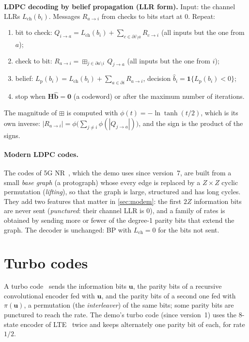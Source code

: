 \documentclass[11pt,a4paper]{article}
\newcommand{\Lch}{L_{\mathrm{ch}}}
\newcommand{\Lp}{L_{\mathrm{p}}}
\theoremstyle{definition}
\theoremstyle{remark}
\newenvironment{keybox}{\begin{center}\begin{lrbox}{\keyboxbin}\begin{minipage}{0.92\textwidth}}{\end{minipage}\end{lrbox}\setlength{\fboxsep}{8pt}\fcolorbox{icemagenta}{iceground}{\usebox{\keyboxbin}}\end{center}}
\begin{document}
\begin{keybox}
\textbf{LDPC decoding by belief propagation (LLR form).} Input: the channel LLRs $\Lch(b_i)$. Messages $R_{a\to i}$ from checks to bits start at 0. Repeat:
\begin{enumerate}[leftmargin=*]
  \item bit to check: $Q_{i\to a} = \Lch(b_i) + \sum_{c\in\partial i\setminus a} R_{c\to i}$ (all inputs but the one from $a$);
  \item check to bit: $R_{a\to i} = \boxplus_{j\in\partial a\setminus i}\, Q_{j\to a}$ (all inputs but the one from $i$);
  \item belief: $\Lp(b_i) = \Lch(b_i) + \sum_{a\in\partial i} R_{a\to i}$, decision $\hat b_i = \mathbf{1}\{\Lp(b_i)<0\}$;
  \item stop when $\bm{H}\hat{\bm{b}} = \bm{0}$ (a codeword) or after the maximum number of iterations.
\end{enumerate}
The magnitude of $\boxplus$ is computed with $\phi(t) = -\ln\tanh(t/2)$, which is its own inverse: $|R_{a\to i}| = \phi\big(\sum_{j\ne i}\phi(|Q_{j\to a}|)\big)$, and the sign is the product of the signs.
\end{keybox}

\paragraph{Modern LDPC codes.} The codes of 5G NR~\cite{ts38212}, which the demo uses since version~7, are built from a small \emph{base graph} (a protograph) whose every edge is replaced by a $Z\times Z$ cyclic permutation (\emph{lifting}), so that the graph is large, structured and has long cycles. They add two features that matter in \cref{sec:modem}: the first $2Z$ information bits are never sent (\emph{punctured}: their channel LLR is 0), and a family of rates is obtained by sending more or fewer of the degree-1 parity bits that extend the graph. The decoder is unchanged: BP with $\Lch=0$ for the bits not sent.

\section{Turbo codes}
\label{sec:turbo}

A turbo code~\cite{berrou} sends the information bits $\bm{u}$, the parity bits of a recursive convolutional encoder fed with $\bm{u}$, and the parity bits of a second one fed with $\pi(\bm{u})$, a permutation (the \emph{interleaver}) of the same bits; some parity bits are punctured to reach the rate. The demo's turbo code (since version~1) uses the 8-state encoder of LTE~\cite{ts36212} twice and keeps alternately one parity bit of each, for rate $1/2$.
\end{document}
